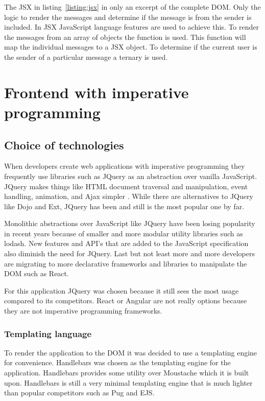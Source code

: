 The JSX in listing~\ref{listing:jsx} in only an excerpt of the complete DOM. Only the logic to render the messages and determine if the message is from the sender is included. In JSX JavaScript language features are used to achieve this. To render the messages from an array of objects the  function is used. This function will map the individual messages to a JSX object. To determine if the current user is the sender of a particular message a ternary is used.

\section{Frontend with imperative programming}
\label{sec:imp-imp}

\subsection{Choice of technologies}

When developers create web applications with imperative programming they frequently use libraries such as JQuery as an abstraction over vanilla JavaScript. JQuery makes things like HTML document traversal and manipulation, event handling, animation, and Ajax simpler \cite{jquery}. While there are alternatives to JQuery like Dojo and Ext, JQuery has been and still is the most popular one by far. 

Monolithic abstractions over JavaScript like JQuery have been losing popularity in recent years because of smaller and more modular utility libraries such as lodash. New features and API's that are added to the JavaScript specification also diminish the need for JQuery. Last but not least more and more developers are migrating to more declarative frameworks and libraries to manipulate the DOM such as React.

For this application JQuery was chosen because it still sees the most usage compared to its competitors. React or Angular are not really options because they are not imperative programming frameworks.

\subsubsection{Templating language}

To render the application to the DOM it was decided to use a templating engine for convenience. Handlebars was chosen as the templating engine for the application. Handlebars provides some utility over Moustache which it is built upon. Handlebars is still a very minimal templating engine that is much lighter than popular competitors such as Pug and EJS. 

